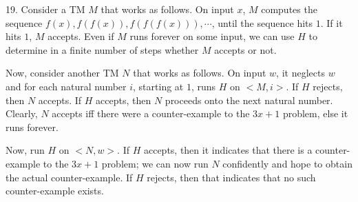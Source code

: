 \documentclass{article}
\begin{document}
19. Consider a TM $M$ that works as follows. On input $x$, $M$ computes the sequence $f(x), f(f(x)), f(f(f(x))), \cdots$, until the sequence hits $1$. If it hits $1$, $M$ accepts. Even if $M$ runs forever on some input, we can use $H$ to determine in a finite number of steps whether $M$ accepts or not.

Now, consider another TM $N$ that works as follows. On input $w$, it neglects $w$ and for each natural number $i$, starting at $1$, runs $H$ on $<M, i>$. If $H$ rejects, then $N$ accepts. If $H$ accepts, then $N$ proceeds onto the next natural number. Clearly, $N$ accepts iff there were a counter-example to the $3x + 1$ problem, else it runs forever.

Now, run $H$ on $<N, w>$. If $H$ accepts, then it indicates that there is a counter-example to the $3x + 1$ problem; we can now run $N$ confidently and hope to obtain the actual counter-example. If $H$ rejects, then that indicates that no such counter-example exists.
\end{document}
